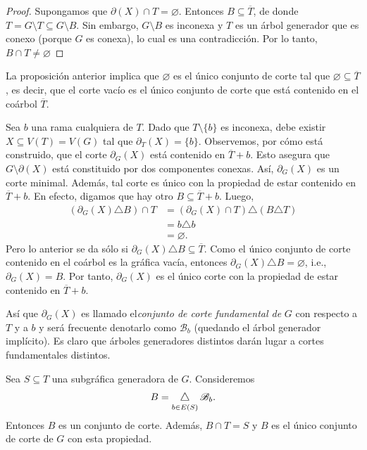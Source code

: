\begin{proof}
Supongamos que $\partial(X) \cap T = \varnothing$. Entonces $B \subseteq \overline{T}$, de donde $T = G\setminus T \subseteq G \setminus B$. Sin embargo, $G\setminus B$ es inconexa y $T$ es un árbol generador que es conexo (porque $G$ es conexa), lo cual es una contradicción. Por lo tanto, $B \cap T \neq \varnothing$ 

\end{proof}

La proposición anterior implica que  $\varnothing$ es el único conjunto de corte tal que  $\varnothing \subseteq \overline{T}$, es decir, que el corte vacío es el único conjunto de corte que está contenido en el coárbol $\overline{T}$.

Sea $b$ una rama cualquiera de $T$. Dado que $T \setminus \{b\}$ es inconexa, debe existir $X \subseteq V(T)=V(G)$ tal que $\partial_{T}(X) = \{b\}$. Observemos, por cómo está construido, que el corte $\partial_{G}(X)$ está contenido en $\overline{T}+b$. Esto asegura que $G \setminus \partial(X)$ está constituido por dos componentes conexas. Así, $\partial_{G}(X)$ es un corte minimal. Además, tal corte es único con la propiedad de estar contenido en $\overline{T}+b$. En efecto, digamos que hay otro $B \subseteq \overline{T} + b$. Luego,
\begin{align*}
(\partial_{G}(X) \triangle B) \cap T &= (\partial_{G}(X) \cap T)\triangle(B\triangle T)\\
&= b \triangle b \\
&= \varnothing.
\end{align*}
Pero lo anterior se da sólo si $\partial_{G}(X)\triangle B \subseteq \overline{T}$. Como el único conjunto de corte contenido en el coárbol es la gráfica vacía, entonces $\partial_{G}(X)\triangle B = \varnothing$, i.e., $\partial_{G}(X)=B$. Por tanto, $\partial_{G}(X)$ es el único corte con la propiedad de estar contenido en $\overline{T}+b$.

Así que $\partial_{G}(X)$ es llamado el\textit{conjunto de corte fundamental de} $G$ con respecto a $T$ y a $b$ y será frecuente denotarlo como $\mathscr{B}_{b}$ (quedando el árbol generador implícito). Es claro que árboles generadores distintos darán lugar a cortes fundamentales distintos. 

\begin{prop}\label{cortesfundamentalespropchida}
Sea $S \subseteq T$ una subgráfica generadora de $G$. Consideremos  
$$
B =\difsym_{b \in E(S)} \mathscr{B}_{b}. 
$$
Entonces $B$ es un conjunto de corte. Además, $B \cap T = S$ y $B$ es el único conjunto de corte de $G$ con esta propiedad.
\end{prop}

